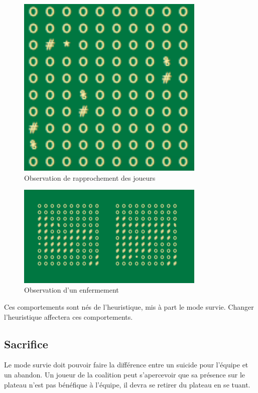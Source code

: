 \begin{figure}[H]
	\centering
	\includegraphics[width=0.8\textwidth, keepaspectratio, height=0.2\textheight]{./pics/rapprochement.png}	
	\caption{Observation de rapprochement des joueurs}
\end{figure}


\begin{figure}[H]
	\centering
	\includegraphics[width=0.8\textwidth, keepaspectratio, height=0.4\textheight]{./pics/enfermement.png}	
	\caption{Observation d'un enfermement}
\end{figure}

Ces comportements sont nés de l'heuristique, mis à part le mode survie.
Changer l'heuristique affectera ces comportements.


\subsection{Sacrifice}
Le mode survie doit pouvoir faire la différence entre un suicide    pour l'équipe et un abandon. Un joueur de la coalition peut s'apercevoir    que sa présence sur le plateau n'est pas bénéfique à l'équipe, il devra    se retirer du plateau en se tuant.


